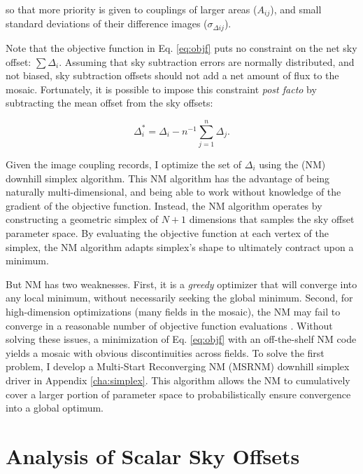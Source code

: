 \documentclass[iop]{emulateapj}
\begin{document}
\noindent so that more priority is given to couplings of larger areas ($A_{ij}$), and small standard deviations of their difference images ($\sigma_{\Delta ij}$).

Note that the objective function in Eq. \ref{eq:objf} puts no constraint on the net sky offset: $\sum \Delta_i$. Assuming that sky subtraction errors are normally distributed, and not biased, sky subtraction offsets should not add a net amount of flux to the mosaic. Fortunately, it is possible to impose this constraint \textit{post facto} by subtracting the mean offset from the sky offsets:

\begin{equation}
    \Delta_i^* = \Delta_i - n^{-1}\sum_{j=1}^n \Delta_j.
    \label{eq:netzero}
\end{equation}

Given the image coupling records, I optimize the set of $\Delta_i$ using the \cite{Nelder:1965} (NM) downhill simplex algorithm. This NM algorithm has the advantage of being naturally multi-dimensional, and being able to work without knowledge of the gradient of the objective function. Instead, the NM algorithm operates by constructing a geometric simplex of $N+1$ dimensions that samples the sky offset parameter space. By evaluating the objective function at each vertex of the simplex, the NM algorithm adapts simplex's shape to ultimately contract upon a minimum.

But NM has two weaknesses. First, it is a \emph{greedy} optimizer that will converge into any local minimum, without necessarily seeking the global minimum. Second, for high-dimension optimizations (many fields in the mosaic), the NM may fail to converge in a reasonable number of objective function evaluations \citep{Neumann:2006}. Without solving these issues, a minimization of Eq. \ref{eq:objf} with an off-the-shelf NM code yields a mosaic with obvious discontinuities across fields. To solve the first problem, I develop a Multi-Start Reconverging NM (MSRNM) downhill simplex driver in Appendix \ref{cha:simplex}. This algorithm allows the NM to cumulatively cover a larger portion of parameter space to probabilistically ensure convergence into a global optimum.

\section{Analysis of Scalar Sky Offsets}
\label{sec:scalaranalysis}
\end{document}
